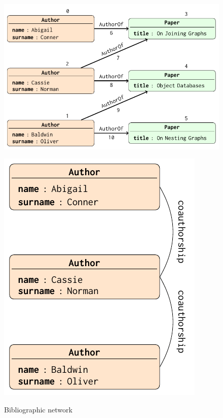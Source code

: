 \begin{figure}
\centering
\begin{minipage}[!t]{0.6\textwidth}
\centering
\includegraphics[width=1\textwidth]{fig/01dataint/04bibliography}
\label{fig:inputbibex}
\end{minipage} \begin{minipage}[!t]{0.3\textwidth}
\centering
\includegraphics[width=\textwidth]{fig/01dataint/041aggregate}
\label{fig:aggrbibex}
\end{minipage}
\caption{Bibliographic network}
\label{fig:bibex}
\end{figure}


